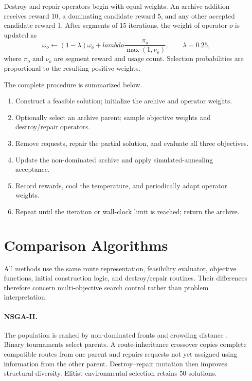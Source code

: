 \documentclass[11pt,a4paper]{article}
\begin{document}
Destroy and repair operators begin with equal weights. An archive addition receives reward 10, a dominating candidate reward 5, and any other accepted candidate reward 1. After segments of 15 iterations, the weight of operator $o$ is updated as
\begin{equation}
 \omega_o\leftarrow (1-\lambda)\omega_o+lambda\frac{\pi_o}{\max(1,\nu_o)},
 \qquad \lambda=0.25,
\end{equation}
where $\pi_o$ and $\nu_o$ are segment reward and usage count. Selection probabilities are proportional to the resulting positive weights.

The complete procedure is summarized below.
\begin{enumerate}[leftmargin=*,itemsep=2pt]
    \item Construct a feasible solution; initialize the archive and operator weights.
    \item Optionally select an archive parent; sample objective weights and destroy/repair operators.
    \item Remove requests, repair the partial solution, and evaluate all three objectives.
    \item Update the non-dominated archive and apply simulated-annealing acceptance.
    \item Record rewards, cool the temperature, and periodically adapt operator weights.
    \item Repeat until the iteration or wall-clock limit is reached; return the archive.
\end{enumerate}

\section{Comparison Algorithms}

All methods use the same route representation, feasibility evaluator, objective functions, initial construction logic, and destroy/repair routines. Their differences therefore concern multi-objective search control rather than problem interpretation.

\paragraph{NSGA-II.} The population is ranked by non-dominated fronts and crowding distance \cite{deb2002nsga2}. Binary tournaments select parents. A route-inheritance crossover copies complete compatible routes from one parent and repairs requests not yet assigned using information from the other parent. Destroy--repair mutation then improves structural diversity. Elitist environmental selection retains 50 solutions.
\end{document}
